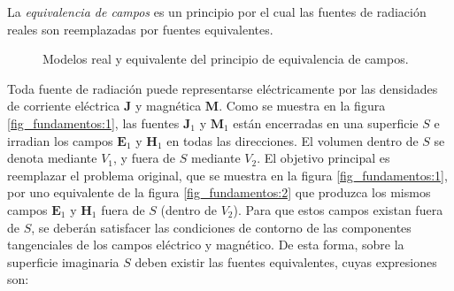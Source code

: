La \emph{equivalencia de campos} es un principio por el cual las fuentes de radiación reales son reemplazadas por fuentes equivalentes.
\begin{figure} [H]
\centering 
{}
\hspace{0.5cm}
\caption{Modelos real y equivalente del principio de equivalencia de campos.}
\label{grup_fig_fundamentos:1}
\end{figure}
Toda fuente de radiación puede representarse eléctricamente por las densidades de corriente eléctrica $\mathbf{J}$ y magnética $\mathbf{M}$. Como se muestra en la figura \ref{fig_fundamentos:1}, las fuentes $\mathbf{J}_1$ y $\mathbf{M}_1$ están encerradas en una superficie $S$ e irradian los campos $\mathbf{E}_1$ y $\mathbf{H}_1$ en todas las direcciones. El volumen dentro de $S$ se denota mediante $V_1$, y fuera de $S$ mediante $V_2$. El objetivo principal es reemplazar el problema original, que se muestra en la figura \ref{fig_fundamentos:1}, por uno equivalente de la figura \ref{fig_fundamentos:2} que produzca los mismos campos $\mathbf{E}_1$ y $\mathbf{H}_1$ fuera de $S$ (dentro de $V_2$). Para que estos campos existan fuera de $S$, se deberán satisfacer las condiciones de contorno de las componentes tangenciales de los campos eléctrico y magnético. De esta forma, sobre la superficie imaginaria $S$ deben existir las fuentes equivalentes, cuyas expresiones son:
